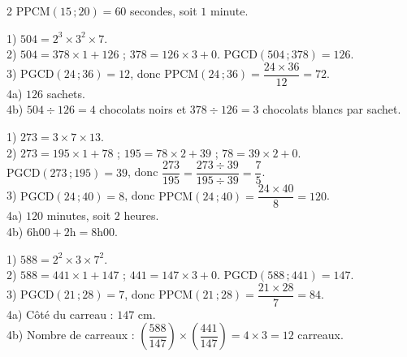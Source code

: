 \begin{multicols}{2}
$\text{PPCM}(15\,;20)=60$ secondes, soit $1$ minute.

1) $504=2^{3}\times3^{2}\times7$.\\
2) $504=378\times1+126$ ; $378=126\times3+0$. $\text{PGCD}(504\,;378)=126$.\\
3) $\text{PGCD}(24\,;36)=12$, donc $\text{PPCM}(24\,;36)=\dfrac{24\times36}{12}=72$.\\
4a) $126$ sachets.\\
4b) $504\div126=4$ chocolats noirs et $378\div126=3$ chocolats blancs par sachet.

1) $273=3\times7\times13$.\\
2) $273=195\times1+78$ ; $195=78\times2+39$ ; $78=39\times2+0$.
$\text{PGCD}(273\,;195)=39$, donc $\dfrac{273}{195}=\dfrac{273\div39}{195\div39}=\dfrac75$.\\
3) $\text{PGCD}(24\,;40)=8$, donc $\text{PPCM}(24\,;40)=\dfrac{24\times40}8=120$.\\
4a) $120$ minutes, soit $2$ heures.\\
4b) $6$h$00+2$h$=8$h$00$.

1) $588=2^{2}\times3\times7^{2}$.\\
2) $588=441\times1+147$ ; $441=147\times3+0$. $\text{PGCD}(588\,;441)=147$.\\
3) $\text{PGCD}(21\,;28)=7$, donc $\text{PPCM}(21\,;28)=\dfrac{21\times28}7=84$.\\
4a) Côté du carreau : $147$ cm.\\
4b) Nombre de carreaux :
$\left(\dfrac{588}{147}\right)\times\left(\dfrac{441}{147}\right)=4\times3=12$ carreaux.

\end{multicols}
\exercicesBanner
